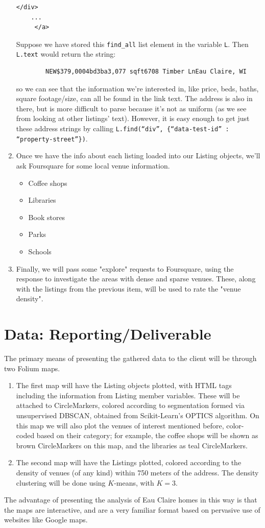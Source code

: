 \documentclass{article}
\begin{document}
\begin{enumerate}
\begin{Verbatim}[commandchars=\\\{\}]
   </div>
    ...
     </a> 
\end{Verbatim}
        Suppose we have stored this {\tt find\_all} list element in the variable {\tt L}. Then {\tt L.text} would return the string:
        \begin{verbatim}
        NEW$379,0004bd3ba3,077 sqft6708 Timber LnEau Claire, WI
        \end{verbatim} so we can see that the information we're interested in, like price, beds, baths, square footage/size, can all be found in the link text. The address is also in there, but is more difficult  to parse because it's not as uniform (as we see from looking at other listings' text). However, it is easy enough to get just these address strings by calling {\tt L.find(``div'', \{``data-test-id'' : ``property-street''\})}. 
\item Once we have the info about each listing loaded into our Listing objects, we'll ask Foursquare for some local venue information. 
    \begin{itemize}
        \item Coffee shops
        \item Libraries
        \item Book stores
        \item Parks
        \item Schools
    \end{itemize}
\item Finally, we will pass some "explore" requests to Foursquare, using the response to investigate the areas with dense and sparse venues. These, along with the listings from the previous item,  will be used to rate the "venue density". 
\end{enumerate}

\section{Data: Reporting/Deliverable}
The primary means of presenting the gathered data to the client will be through two Folium maps. 
\begin{enumerate}
    \item The first map will have the Listing objects plotted, with HTML tags including the information from Listing member variables. These will be attached to CircleMarkers, colored according to segmentation formed via unsupervised DBSCAN, obtained from Scikit-Learn's OPTICS algorithm. On this map we will also plot the venues of interest mentioned before, color-coded based on their category; for example, the coffee shops will be shown as brown CircleMarkers on this map, and the libraries as teal CircleMarkers. 
    \item The second map will have the Listings plotted, colored according to the density of venues (of any kind) within 750 meters of the address. The density clustering will be done using $K$-means, with $K=3$. 
\end{enumerate}
The advantage of presenting the analysis of Eau Claire homes in this way is that the maps are interactive, and are a very familiar format based on pervasive use of websites like Google maps. 
\end{document}
